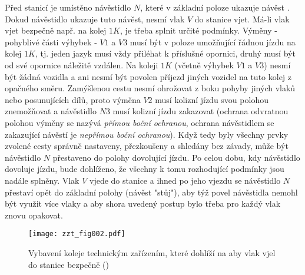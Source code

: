   Před stanicí je umístěno návěstidlo \(N\), které v základní poloze ukazuje návěst . Dokud
  návěstidlo ukazuje tuto návěst, nesmí vlak \(V\) do stanice vjet. Má-li vlak vjet bezpečně např. 
  na kolej \(1K\), je třeba splnit určité podmínky. Výměny - pohyblivé části výhybek - \(V1\) a 
  \(V3\) musí být v poloze umožňující řádnou jízdu na kolej \(1K\), tj. jeden jazyk musí
  vždy přiléhat k příslušné opornici, druhý musí být od své opornice náležitě vzdálen. Na koleji 
  \(1K\) (včetně výhybek \(V1\) a \(V3\)) nesmí být žádná vozidla a ani nesmí být povolen příjezd
  jiných vozidel na tuto kolej z opačného směru. Zamýšlenou cestu nesmí ohrožovat z boku pohyby 
  jiných vlaků nebo posunujících dílů, proto výměna \(V2\) musí kolizní jízdu svou polohou 
  znemožňovat a návěstidlo \(N3\) musí kolizní jízdu zakazovat (ochrana odvratnou polohou výměny se 
  nazývá \emph{přímou boční ochranou}, ochrana návěstidlem se zakazující návěstí je \emph{nepřímou 
  boční ochranou}). Když tedy byly všechny prvky zvolené cesty správně nastaveny, přezkoušeny a 
  shledány bez závady, může být návěstidlo \(N\) přestaveno do polohy dovolující jízdu. Po celou 
  dobu, kdy návěstidlo dovoluje jízdu, bude dohlíženo, že všechny k tomu rozhodující podmínky jsou 
  nadále splněny. Vlak \(V\) vjede do stanice a ihned po jeho vjezdu se návěstidlo \(N\) přestaví 
  opět do základní polohy (návěst "stůj"), aby týž povel návěstidla nemohl být využit více vlaky a 
  aby shora uvedený postup bylo třeba pro každý vlak znovu opakovat.

  \begin{figure}[ht!] %
    \centering
    \texttt{[image: zzt\_fig002.pdf]}
    \caption{Vybavení koleje technickým zařízením, které dohlíží na aby vlak vjel do stanice 
             bezpečně
             (\cite[s.~5]{Chudacek2005})}
    \label{zzt:fig002}
  \end{figure}
  
